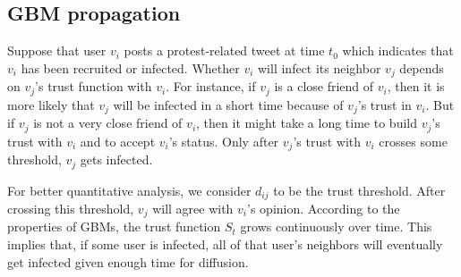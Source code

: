 

\subsection{GBM propagation}
Suppose that user $v_i$ posts a protest-related tweet at time
$t_0$ which indicates that $v_i$ has been recruited or infected.
Whether $v_i$ will infect its neighbor $v_j$ depends on $v_j$'s trust function with $v_i$. For instance, if $v_j$ is a close friend of $v_i$, then it is more likely that $v_j$ will be infected in a short time because of $v_j$'s trust in $v_i$. But if $v_j$ is not a very close friend of $v_i$, then it might take a long time to build $v_j$'s trust with $v_i$ and to accept $v_i$'s status. Only after $v_j$'s trust with $v_i$ crosses some threshold, $v_j$ gets infected.

For better quantitative analysis, we consider $d_{ij}$ to be the trust threshold. After crossing this threshold, $v_j$ will agree with $v_i$'s opinion. According to the properties of GBMs, the trust function $S_t$ grows continuously over time. This implies that, if some user is infected, all of that user's neighbors will eventually get infected given enough time for diffusion.

